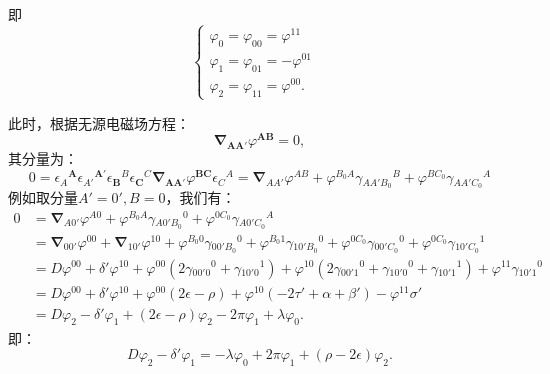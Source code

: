 即
\begin{equation*}
	\begin{cases}
		\varphi _{0} =\varphi _{00} =\varphi ^{11} & \\
		\varphi _{1} =\varphi _{01} =-\varphi ^{01} & \\
		\varphi _{2} =\varphi _{11} =\varphi ^{00} . & 
	\end{cases}
\end{equation*}


此时，根据无源电磁场方程：
\begin{equation*}
	\mathbf{\nabla }_{\boldsymbol{AA} '} \varphi ^{\boldsymbol{AB}} =0,
\end{equation*}
其分量为：
\begin{equation*}
	0=\epsilon {_{A}}^{\boldsymbol{A}} \epsilon {_{A'}}^{\boldsymbol{A} '} \epsilon {_{\boldsymbol{B}}}^{B} \epsilon {_{\boldsymbol{C}}}^{C}\mathbf{\nabla }_{\boldsymbol{AA} '} \varphi ^{\boldsymbol{BC}} \epsilon {_{C}}^{A} =\mathbf{\nabla }_{AA'} \varphi ^{AB} +\varphi ^{B_{0} A} \gamma {_{AA'B_{0}}}^{B} +\varphi ^{BC_{0}} \gamma {_{AA'C_{0}}}^{A}
\end{equation*}
例如取分量$A'=0',B=0$，我们有：
\begin{equation*}
	\begin{aligned}
		0 & =\mathbf{\nabla }_{A0'} \varphi ^{A0} +\varphi ^{B_{0} A} \gamma {_{A0'B_{0}}}^{0} +\varphi ^{0C_{0}} \gamma {_{A0'C_{0}}}^{A}\\
		& =\mathbf{\nabla }_{00'} \varphi ^{00} +\mathbf{\nabla }_{10'} \varphi ^{10} +\varphi ^{B_{0} 0} \gamma {_{00'B_{0}}}^{0} +\varphi ^{B_{0} 1} \gamma {_{10'B_{0}}}^{0} +\varphi ^{0C_{0}} \gamma {_{00'C_{0}}}^{0} +\varphi ^{0C_{0}} \gamma {_{10'C_{0}}}^{1}\\
		& =D\varphi ^{00} +\delta '\varphi ^{10} +\varphi ^{00} (2\gamma {_{00'0}}^{0} +\gamma {_{10'0}}^{1} )+\varphi ^{10} (2\gamma {_{00'1}}^{0} +\gamma {_{10'0}}^{0} +\gamma {_{10'1}}^{1} )+\varphi ^{11} \gamma {_{10'1}}^{0}\\
		& =D\varphi ^{00} +\delta '\varphi ^{10} +\varphi ^{00} (2\epsilon -\rho )+\varphi ^{10} (-2\tau '+\alpha +\beta ')-\varphi ^{11} \sigma '\\
		& =D\varphi _{2} -\delta '\varphi _{1} +(2\epsilon -\rho )\varphi _{2} -2\pi \varphi _{1} +\lambda \varphi _{0} .
	\end{aligned}
\end{equation*}
即：
\begin{equation}
	D\varphi _{2} -\delta '\varphi _{1} =-\lambda \varphi _{0} +2\pi \varphi _{1} +( \rho -2\epsilon ) \varphi _{2} .
	\label{eq:7.5}
\end{equation}
